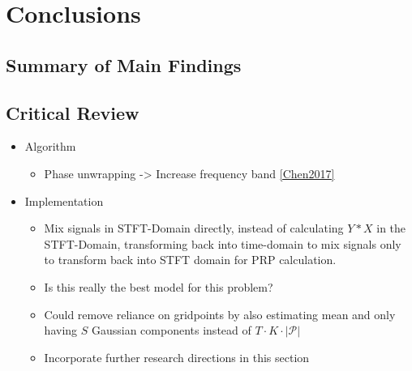 \chapter{Conclusions}
\label{chap:concl}


\section{Summary of Main Findings}

\section{Critical Review}
\label{sec:critical-review}

\begin{itemize}
    \item Algorithm
    \begin{itemize}
        \item Phase unwrapping -> Increase frequency band \ref{Chen2017}
    \end{itemize}
    \item Implementation
    \begin{itemize}
        \item Mix signals in STFT-Domain directly, instead of calculating $Y*X$ in the STFT-Domain, transforming back into time-domain to mix signals only to transform back into STFT domain for PRP calculation.
        \item Is this really the best model for this problem?
        \item Could remove reliance on gridpoints by also estimating mean and only having $S$ Gaussian components instead of $T\cdot K\cdot |\mathcal{P}|$
        \item Incorporate further research directions in this section
    \end{itemize}
\end{itemize}
